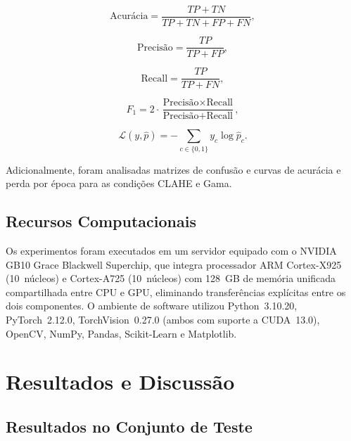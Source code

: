 \documentclass[conference]{IEEEtran}
\begin{document}
\begin{equation}
\text{Acurácia} = \frac{TP+TN}{TP+TN+FP+FN},
\label{eq:acc}
\end{equation}

\begin{equation}
\text{Precisão} = \frac{TP}{TP+FP},
\label{eq:prec}
\end{equation}

\begin{equation}
\text{Recall} = \frac{TP}{TP+FN},
\label{eq:recall}
\end{equation}

\begin{equation}
F_1 = 2\cdot\frac{\text{Precisão}\times\text{Recall}}{\text{Precisão}+\text{Recall}},
\label{eq:f1}
\end{equation}

\begin{equation}
\mathcal{L}(y,\hat{p}) = -\sum_{c\in\{0,1\}} y_c \log \hat{p}_c.
\label{eq:loss}
\end{equation}

\noindent Adicionalmente, foram analisadas matrizes de confusão e curvas de
acurácia e perda por época para as condições CLAHE e Gama.

\subsection{Recursos Computacionais}

Os experimentos foram executados em um servidor equipado com o NVIDIA GB10
Grace Blackwell Superchip, que integra processador ARM Cortex-X925
(10~núcleos) e Cortex-A725 (10~núcleos) com 128~GB de memória unificada
compartilhada entre CPU e GPU, eliminando transferências explícitas entre
os dois componentes. O ambiente de software utilizou Python~3.10.20,
PyTorch~2.12.0, TorchVision~0.27.0 (ambos com suporte a CUDA~13.0),
OpenCV, NumPy, Pandas, Scikit-Learn e Matplotlib.

\section{Resultados e Discussão}

\subsection{Resultados no Conjunto de Teste}
\end{document}
